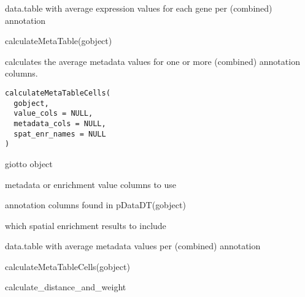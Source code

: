 \documentclass[a4paper]{book}
\begin{document}
%
\begin{Value}
data.table with average expression values for each gene per (combined) annotation
\end{Value}
%
\begin{Examples}
\begin{ExampleCode}
    calculateMetaTable(gobject)
\end{ExampleCode}
\end{Examples}
%
\begin{Description}\relax
calculates the average metadata values for one or more (combined) annotation columns.
\end{Description}
%
\begin{Usage}
\begin{verbatim}
calculateMetaTableCells(
  gobject,
  value_cols = NULL,
  metadata_cols = NULL,
  spat_enr_names = NULL
)
\end{verbatim}
\end{Usage}
%
\begin{Arguments}
\begin{ldescription}
\item[\code{gobject}] giotto object

\item[\code{value\_cols}] metadata or enrichment value columns to use

\item[\code{metadata\_cols}] annotation columns found in pDataDT(gobject)

\item[\code{spat\_enr\_names}] which spatial enrichment results to include
\end{ldescription}
\end{Arguments}
%
\begin{Value}
data.table with average metadata values per (combined) annotation
\end{Value}
%
\begin{Examples}
\begin{ExampleCode}
    calculateMetaTableCells(gobject)
\end{ExampleCode}
\end{Examples}
%
\begin{Description}\relax
calculate\_distance\_and\_weight
\end{Description}
\end{document}
